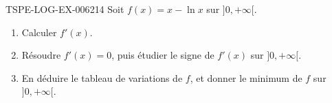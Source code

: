 \begin{exercice}{TSPE-LOG-EX-006}{2}{14}
Soit $f(x) = x - \ln x$ sur $]0, +\infty[$.
\begin{enumerate}
  \item Calculer $f'(x)$.
  \item Résoudre $f'(x)=0$, puis étudier le signe de $f'(x)$ sur $]0,+\infty[$.
  \item En déduire le tableau de variations de $f$, et donner le minimum de $f$ sur $]0,+\infty[$.
\end{enumerate}
\end{exercice}
